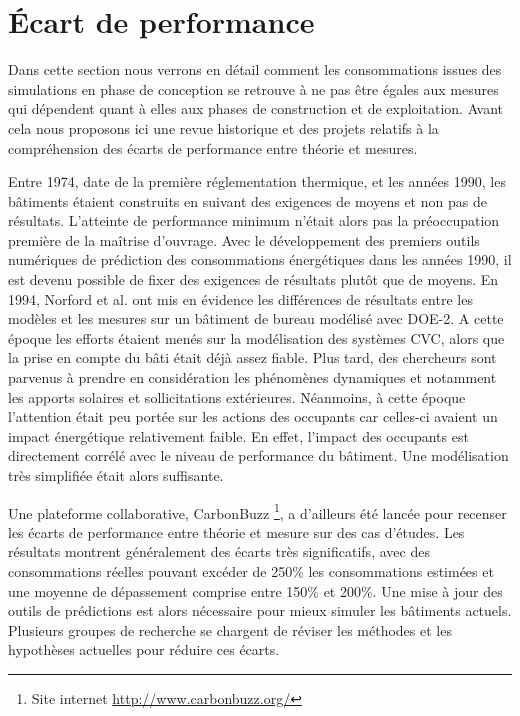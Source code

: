 \section{Écart de performance}
\label{performance gap}

Dans cette section nous verrons en détail comment les consommations issues des simulations en phase de conception se retrouve à ne pas être égales aux mesures qui dépendent quant à elles aux phases de construction et de exploitation. Avant cela nous proposons ici une revue historique et des projets relatifs à la compréhension des écarts de performance entre théorie et mesures.

Entre 1974, date de la première réglementation thermique, et les années 1990, les bâtiments étaient construits en suivant des exigences de moyens et non pas de résultats. L'atteinte de performance minimum n'était alors pas la préoccupation première de la maîtrise d'ouvrage. Avec le développement des premiers outils numériques de prédiction des consommations énergétiques dans les années 1990, il est devenu possible de fixer des exigences de résultats plutôt que de moyens. En 1994, Norford et al. \cite{Norford-94} ont mis en évidence les différences de résultats entre les modèles et les mesures sur un bâtiment de bureau modélisé avec DOE-2. A cette époque les efforts étaient menés sur la modélisation des systèmes CVC, alors que la prise en compte du bâti était déjà assez fiable. Plus tard, des chercheurs sont parvenus à prendre en considération les phénomènes dynamiques et notamment les apports solaires et sollicitations extérieures. Néanmoins, à cette époque l'attention était peu portée sur les actions des occupants car celles-ci avaient un impact énergétique relativement faible. En effet, l'impact des occupants est directement corrélé avec le niveau de performance du bâtiment. Une modélisation très simplifiée était alors suffisante.

Une plateforme collaborative, CarbonBuzz \footnote{Site internet \url{http://www.carbonbuzz.org/}}, a d'ailleurs été lancée pour recenser les écarts de performance entre théorie et mesure sur des cas d'études. Les résultats montrent généralement des écarts très significatifs, avec des consommations réelles pouvant excéder de 250\% les consommations estimées et une moyenne de dépassement comprise entre 150\% et 200\%. Une mise à jour des outils de prédictions est alors nécessaire pour mieux simuler les bâtiments actuels. Plusieurs groupes de recherche se chargent de réviser les méthodes et les hypothèses actuelles pour réduire ces écarts. 

